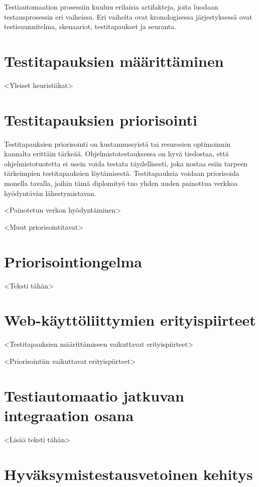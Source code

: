 Testiautomaation prosessiin kuuluu erilaisia artifakteja, joita luodaan testausprosessin eri vaiheissa.
Eri vaiheita ovat kronologisessa järjestyksessä ovat testisuunnitelma, skenaariot, testitapaukset ja seuranta.

\section{Testitapauksien määrittäminen}

<Yleiset heuristiikat>

\section{Testitapauksien priorisointi}

Testitapauksien priorisointi on kustannussyistä tai resurssien optimoinnin kannalta erittäin tärkeää.
Ohjelmistotestauksessa on hyvä tiedostaa, että ohjelmistotuotetta ei usein voida testata täydellisesti, joka nostaa esiin tarpeen tärkeimpien testitapauksien löytämisestä.
Testitapauksia voidaan priorisoida monella tavalla, joihin tämä diplomityö tuo yhden uuden painottua verkkoa hyödyntävän lähestymistavan.

<Painotetun verkon hyödyntäminen>

<Muut priorisointitavat>

\section{Priorisointiongelma}

<Teksti tähän>

\section{Web-käyttöliittymien erityispiirteet}

<Testitapauksien määrittämiseen vaikuttavat erityispiirteet>

<Priorisointiin vaikuttavat erityispiirteet>

\section{Testiautomaatio jatkuvan integraation osana}

<Lisää teksti tähän>

\section{Hyväksymistestausvetoinen kehitys}

